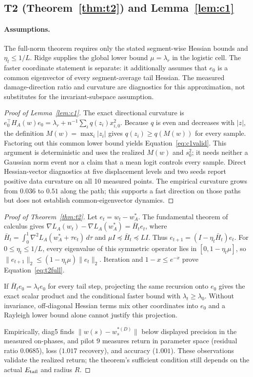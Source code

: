 \documentclass{article}
\begin{document}
\subsection{T2 (Theorem~\ref{thm:t2}) and Lemma~\ref{lem:c1}}
\paragraph{Assumptions.} The full-norm theorem requires only the stated segment-wise Hessian
bounds and $\eta_t\leq1/L$. Ridge supplies the global lower bound $\mu=\lambda_r$ in the
logistic cell. The faster coordinate statement is separate: it additionally assumes that
$e_0$ is a common eigenvector of every segment-average tail Hessian. The measured
damage-direction ratio and curvature are diagnostics for this approximation, not substitutes
for the invariant-subspace assumption.

\begin{proof}[Proof of Lemma~\ref{lem:c1}]
The exact directional curvature is
$e_0^\top H_A(w)e_0=\lambda_r+n^{-1}\sum_iq(z_i)x_{i,0}^2$.
Because $q$ is even and decreases with $|z|$, the definition
$M(w)=\max_i|z_i|$ gives $q(z_i)\geq q(M(w))$ for every sample. Factoring out this common
lower bound yields Equation~\ref{eq:c1valid}. This argument is deterministic and uses the
realized $M(w)$ and $s_0^2$; it needs neither a Gaussian norm event nor a claim that a mean
logit controls every sample. Direct Hessian-vector diagnostics at five displacement levels and
two seeds report positive data curvature on all 10 measured points. The empirical curvature
grows from $0.036$ to $0.51$ along the path; this supports a fast direction on those paths but
does not establish common-eigenvector dynamics.
\end{proof}

\begin{proof}[Proof of Theorem~\ref{thm:t2}]
Let $e_t=w_t-w_A^*$. The fundamental theorem of calculus gives
$\nabla L_A(w_t)-\nabla L_A(w_A^*)=\bar H_te_t$, where
$\bar H_t=\int_0^1\nabla^2L_A(w_A^*+\tau e_t)\,d\tau$ and
$\mu I\preceq\bar H_t\preceq LI$. Thus
$e_{t+1}=(I-\eta_t\bar H_t)e_t$. For $0\leq\eta_t\leq1/L$, every eigenvalue of this symmetric
operator lies in $[0,1-\eta_t\mu]$, so
$\|e_{t+1}\|_2\leq(1-\eta_t\mu)\|e_t\|_2$. Iteration and
$1-x\leq e^{-x}$ prove Equation~\ref{eq:t2full}.

If $\bar H_te_0=\lambda_te_0$ for every tail step, projecting the same recursion onto $e_0$
gives the exact scalar product and the conditional faster bound with
$\lambda_t\geq\lambda_0$. Without invariance, off-diagonal Hessian terms mix other coordinates
into $e_0$ and a Rayleigh lower bound alone cannot justify this projection.

Empirically, diag5 finds $\|w(s)-w_s^{*(D)}\|$ below displayed precision in the measured
on-phases, and pilot 9 measures return in parameter space (residual ratio $0.0685$), loss
($1.017$ recovery), and accuracy ($1.001$). These observations validate the realized return;
the theorem's sufficient condition still depends on the actual $E_{\rm tail}$ and radius $R$.
\end{proof}
\end{document}
